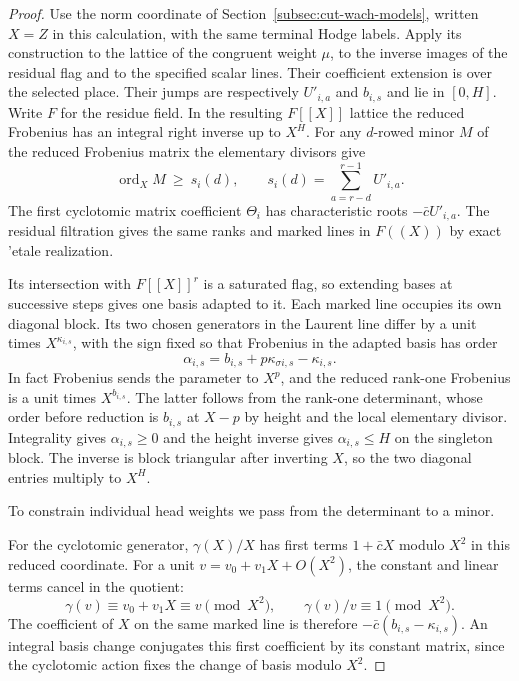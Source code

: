 \begin{proof}
Use the norm coordinate of Section~\ref{subsec:cut-wach-models},
written \(X=Z\) in this calculation, with the same terminal
Hodge labels. Apply its construction to
the lattice of the congruent weight \(\mu\), to the inverse
images of the residual flag and to the specified scalar lines.
Their coefficient extension is over the selected place. Their
jumps are respectively \(U'_{i,a}\) and \(b_{i,s}\) and lie
in \([0,H]\). Write \(F\) for the residue field. In the resulting
\(F[[X]]\) lattice the reduced Frobenius has an integral right
inverse up to \(X^H\). For any \(d\)-rowed minor \(M\) of the reduced Frobenius matrix the elementary divisors give
\[
 \operatorname{ord}_X M\ \ge\ s_i(d),\qquad s_i(d)=\sum_{a=r-d}^{r-1}U'_{i,a}.
\]
The first cyclotomic matrix coefficient \(\Theta_i\) has
characteristic roots \(-\bar c U'_{i,a}\).
The residual filtration gives the same ranks and marked lines in
\(F((X))\) by exact 'etale realization.

Its intersection with
\(F[[X]]^r\) is a saturated flag, so extending bases at successive
steps gives one basis adapted to it. Each marked line occupies its own
diagonal block. Its two chosen generators in the Laurent
line differ by a unit times \(X^{\kappa_{i,s}}\), with the
sign fixed so that Frobenius in the adapted basis has order
\[
        \alpha_{i,s}=b_{i,s}+p\kappa_{\sigma i,s}-\kappa_{i,s}.
\]
In fact Frobenius sends the parameter to \(X^p\), and the
reduced rank-one Frobenius is a unit times \(X^{b_{i,s}}\).
The latter follows from the rank-one determinant, whose
order before reduction is \(b_{i,s}\) at \(X-p\) by height
and the local elementary divisor. Integrality gives
\(\alpha_{i,s}\ge0\) and the height inverse gives
\(\alpha_{i,s}\le H\) on the singleton block. The inverse
is block triangular after inverting \(X\), so the two
diagonal entries multiply to \(X^H\).

To constrain individual head weights we pass from the determinant to a minor.

For the cyclotomic generator, \(\gamma(X)/X\) has first
terms \(1+\bar c X\) modulo \(X^2\) in this reduced
coordinate. For a unit \(v=v_0+v_1X+O(X^2)\), the constant and linear terms cancel in the quotient:
\[
 \gamma(v)\equiv v_0+v_1X\equiv v\pmod{X^2},\qquad \gamma(v)/v\equiv1\pmod{X^2}.
\] The coefficient of \(X\) on the same marked line
is therefore \(-\bar c(b_{i,s}-\kappa_{i,s})\).
An integral basis change conjugates this first coefficient by
its constant matrix, since the cyclotomic action fixes the
change of basis modulo \(X^2\).


\end{proof}
